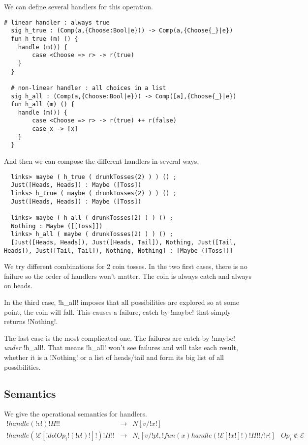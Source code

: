 \documentclass[11pt, nonacm=true, language=french, language=english]{acmart}
\begin{document}
We can define several handlers for this operation.

\begin{lstlisting}[caption=Toss handlers]
  # linear handler : always true
  sig h_true : (Comp(a,{Choose:Bool|e})) -> Comp(a,{Choose{_}|e})
  fun h_true (m) () {
    handle (m()) {
        case <Choose => r> -> r(true)
    }
  }

  # non-linear handler : all choices in a list
  sig h_all : (Comp(a,{Choose:Bool|e})) -> Comp([a],{Choose{_}|e})
  fun h_all (m) () {
    handle (m()) {
        case <Choose => r> -> r(true) ++ r(false)
        case x -> [x]
    }
  }
\end{lstlisting}

And then we can compose the different handlers in several ways.

\begin{lstlisting}
  links> maybe ( h_true ( drunkTosses(2) ) ) () ;
  Just([Heads, Heads]) : Maybe ([Toss])
  links> h_true ( maybe ( drunkTosses(2) ) ) () ;
  Just([Heads, Heads]) : Maybe ([Toss])

  links> maybe ( h_all ( drunkTosses(2) ) ) () ;
  Nothing : Maybe ([[Toss]])
  links> h_all ( maybe ( drunkTosses(2) ) ) () ;
  [Just([Heads, Heads]), Just([Heads, Tail]), Nothing, Just([Tail, Heads]), Just([Tail, Tail]), Nothing, Nothing] : [Maybe ([Toss])]
\end{lstlisting}

We try different combinations for 2 coin tosses. In the two first cases, there is no failure so the order of handlers won't matter. The coin is always catch and always on heads.

In the third case, !h_all! imposes that all possibilities are explored so at some point, the coin will fall. This causes a failure, catch by !maybe! that simply returns !Nothing!.

The last case is the most complicated one. The failures are catch by !maybe! \emph{under} !h_all!. That means !h_all! won't see failures and will take each result, whether it is a !Nothing! or a list of heads/tail and form its big list of all possibilities.


\subsection{Semantics}
\label{sec:semantics}

We give the operational semantics for handlers.
\[
  \begin{array}{rcll}
    !handle ( !v! ) { !H! }! & \longrightarrow & N[v/!x!] \\
    !handle ( !\mathcal E[!do !Op_{i}!( !v! )!]! ) { !H! }! & \longrightarrow & N_{i}[v/!p!, !fun (x)  { handle ( !\mathcal E[!x!] ! ) { !H! } }!/!r!] & Op_{i} \notin \mathcal E\\
  \end{array}
\]
\end{document}
